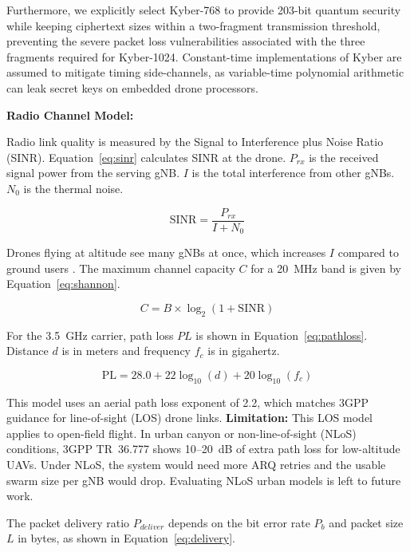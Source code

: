 \documentclass{ieeeaccess}
\begin{document}
Furthermore, we explicitly select Kyber-768 to provide 203-bit quantum security while keeping ciphertext sizes within a two-fragment transmission threshold, preventing the severe packet loss vulnerabilities associated with the three fragments required for Kyber-1024. Constant-time implementations of Kyber are assumed to mitigate timing side-channels, as variable-time polynomial arithmetic can leak secret keys on embedded drone processors.


\vspace{2mm}\noindent\textbf{Radio Channel Model:}

Radio link quality is measured by the Signal to Interference plus Noise Ratio (SINR). Equation~\ref{eq:sinr} calculates SINR at the drone. $P_{rx}$ is the received signal power from the serving gNB. $I$ is the total interference from other gNBs. $N_0$ is the thermal noise.

\begin{equation}
\mathrm{SINR} = \frac{P_{rx}}{I + N_0}
\label{eq:sinr}
\end{equation}

Drones flying at altitude see many gNBs at once, which increases $I$ compared to ground users \cite{ref20}. The maximum channel capacity $C$ for a 20~MHz band is given by Equation~\ref{eq:shannon}.

\begin{equation}
C = B \times \log_{2}(1 + \mathrm{SINR})
\label{eq:shannon}
\end{equation}

For the 3.5~GHz carrier, path loss $PL$ is shown in Equation~\ref{eq:pathloss}. Distance $d$ is in meters and frequency $f_c$ is in gigahertz.

\begin{equation}
\mathrm{PL} = 28.0 + 22\log_{10}(d) + 20\log_{10}(f_c)
\label{eq:pathloss}
\end{equation}

This model uses an aerial path loss exponent of 2.2, which matches 3GPP guidance for line-of-sight (LOS) drone links. \textbf{Limitation:} This LOS model applies to open-field flight. In urban canyon or non-line-of-sight (NLoS) conditions, 3GPP TR~36.777 shows 10--20~dB of extra path loss for low-altitude UAVs. Under NLoS, the system would need more ARQ retries and the usable swarm size per gNB would drop. Evaluating NLoS urban models is left to future work.

The packet delivery ratio $P_{deliver}$ depends on the bit error rate $P_b$ and packet size $L$ in bytes, as shown in Equation~\ref{eq:delivery}.
\end{document}

